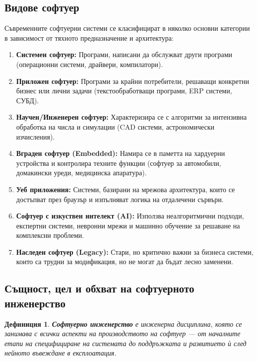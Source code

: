 \documentclass{scrartcl}
\newtheorem{definition}{Дефиниция}
\begin{document}
\begin{FlushLeft}
\subsection{Видове софтуер}
Съвременните софтуерни системи се класифицират в няколко основни категории в зависимост от тяхното предназначение и архитектура:
\begin{enumerate}
    \item \textbf{Системен софтуер:} Програми, написани да обслужват други програми (операционни системи, драйвери, компилатори).
    \item \textbf{Приложен софтуер:} Програми за крайни потребители, решаващи конкретни бизнес или лични задачи (текстообработващи програми, ERP системи, СУБД).
    \item \textbf{Научен/Инженерен софтуер:} Характеризира се с алгоритми за интензивна обработка на числа и симулации (CAD системи, астрономически изчисления).
    \item \textbf{Вграден софтуер (Embedded):} Намира се в паметта на хардуерни устройства и контролира техните функции (софтуер за автомобили, домакински уреди, медицинска апаратура).
    \item \textbf{Уеб приложения:} Системи, базирани на мрежова архитектура, които се достъпват през браузър и изпълняват логика на отдалечени сървъри.
    \item \textbf{Софтуер с изкуствен интелект (AI):} Използва неалгоритмични подходи, експертни системи, невронни мрежи и машинно обучение за решаване на комплексни проблеми.
    \item \textbf{Наследен софтуер (Legacy):} Стари, но критично важни за бизнеса системи, които са трудни за модификация, но не могат да бъдат лесно заменени.
\end{enumerate}

\subsection{Същност, цел и обхват на софтуерното инженерство}
\begin{definition}
\textbf{Софтуерно инженерство} е инженерна дисциплина, която се занимава с всички аспекти на производството на софтуер — от началните етапи на специфициране на системата до поддръжката и развитието ѝ след нейното въвеждане в експлоатация.
\end{definition}


\end{FlushLeft}
\end{document}
